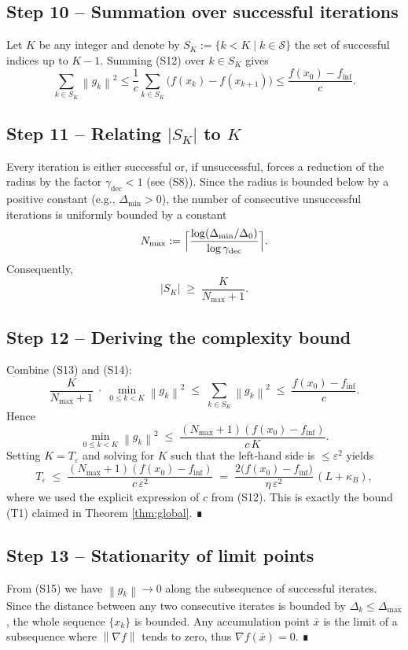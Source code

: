 \documentclass[11pt]{article}
\newcommand{\norm}[1]{\left\lVert#1\right\rVert}
\begin{document}
\subsection*{Step 10 – Summation over successful iterations}
Let $K$ be any integer and denote by $S_K:=\{k< K\mid k\in\mathcal{S}\}$ the set of successful indices up to $K-1$. Summing (S12) over $k\in S_K$ gives
\[
\sum_{k\in S_K}\norm{g_k}^{2}
\le \frac{1}{c}\sum_{k\in S_K}\bigl(f(x_k)-f(x_{k+1})\bigr)
\le \frac{f(x_0)-f_{\inf}}{c}.
\tag{S13}
\]

\subsection*{Step 11 – Relating $|S_K|$ to $K$}
Every iteration is either successful or, if unsuccessful, forces a reduction of the radius by the factor $\gamma_{\text{dec}}<1$ (see (S8)). Since the radius is bounded below by a positive constant (e.g., $\Delta_{\min}>0$), the number of consecutive unsuccessful iterations is uniformly bounded by a constant
\[
N_{\max}:= \Bigl\lceil\frac{\log(\Delta_{\min}/\Delta_{0})}{\log\gamma_{\text{dec}}}\Bigr\rceil .
\]
Consequently,
\[
|S_K|\;\ge\;\frac{K}{N_{\max}+1}.
\tag{S14}
\]

\subsection*{Step 12 – Deriving the complexity bound}
Combine (S13) and (S14):
\[
\frac{K}{N_{\max}+1}\;\cdot\;\min_{0\le k<K}\norm{g_k}^{2}
\;\le\;
\sum_{k\in S_K}\norm{g_k}^{2}
\;\le\;
\frac{f(x_0)-f_{\inf}}{c}.
\]
Hence
\[
\min_{0\le k<K}\norm{g_k}^{2}
\;\le\;
\frac{(N_{\max}+1)(f(x_0)-f_{\inf})}{c\,K}.
\tag{S15}
\]
Setting $K=T_{\varepsilon}$ and solving for $K$ such that the left‑hand side is $\le\varepsilon^{2}$ yields
\[
T_{\varepsilon}
\;\le\;
\frac{(N_{\max}+1)(f(x_0)-f_{\inf})}{c\,\varepsilon^{2}}
\;=\;
\frac{2\bigl(f(x_0)-f_{\inf}\bigr)}{\eta\,\varepsilon^{2}}\,(L+\kappa_B),
\]
where we used the explicit expression of $c$ from (S12). This is exactly the bound (T1) claimed in Theorem \ref{thm:global}. ∎

\subsection*{Step 13 – Stationarity of limit points}
From (S15) we have $\norm{g_k}\to0$ along the subsequence of successful iterates. Since the distance between any two consecutive iterates is bounded by $\Delta_k\le\Delta_{\max}$, the whole sequence $\{x_k\}$ is bounded. Any accumulation point $\bar x$ is the limit of a subsequence where $\norm{\nabla f}$ tends to zero, thus $\nabla f(\bar x)=0$. ∎
\end{document}
